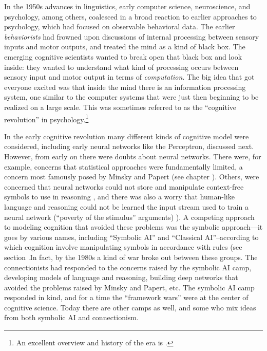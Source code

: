 In the 1950s advances in linguistics, early computer science, neuroscience, and psychology, among others, coalesced in a broad reaction to earlier approaches to psychology, which had focused on observable behavioral data. The earlier \emph{behaviorists} had frowned upon discussions of internal processing between sensory inputs and motor outputs, and treated the mind as a kind of black box. The emerging cognitive scientists wanted to break open that black box and look inside: they wanted to understand what kind of processing occurs between sensory input and motor output in terms of \emph{computation}. The big idea that got everyone excited was that inside the mind there is an information processing system, one similar to the computer systems that were just then beginning to be realized on a large scale. This was sometimes referred to as the ``cognitive revolution'' in psychology.\footnote{An excellent overview and history of the era is \cite{baars1986cognitive}.}  

In the early cognitive revolution many different kinds of cognitive model were considered, including early neural networks like the Perceptron, discussed next. However, from early on there were doubts about neural networks. There were, for example, concerns that statistical approaches were fundamentally limited, a concern most famously posed by Minsky and Papert (see chapter ). Others, were concerned that neural networks could not store and manipulate context-free symbols to use in reasoning \cite{fodor1988connectionism}, and there was also a worry that human-like language and reasoning could not be learned the input stream used to train a neural network (``poverty of the stimulus'' arguments) \cite{berwick2011poverty}). A competing approach to modeling cognition that avoided these problems was the symbolic approach---it goes by various names, including ``Symbolic AI'' and ``Classical AI''--according to which cognition involve manipulating symbols in accordance with rules (see section .In fact, by the 1980s a kind of war broke out between these groups.  The connectionists had responded to the concerns raised by the symbolic AI camp, developing models of language and reasoning, building deep networks that avoided the problems raised by Minsky and Papert, etc. The symbolic AI camp responded in kind, and for a time the ``framework wars'' were at the center of cognitive science. Today there are other camps as well, and some who mix ideas from both symbolic AI and connectionism. 

